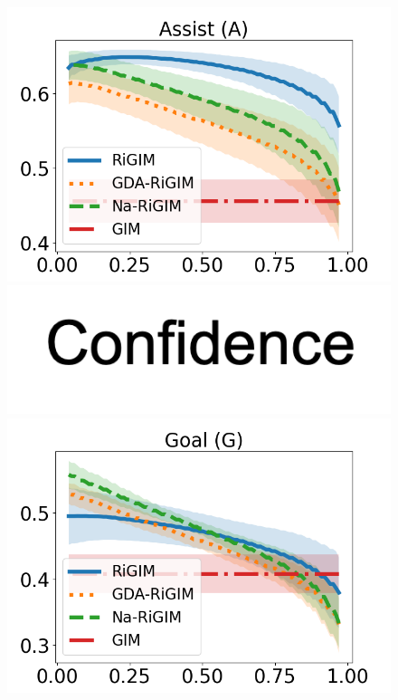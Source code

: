 \documentclass[letterpaper]{article} %
\begin{document}
\begin{figure}[htbp]
\begin{minipage}{0.01\textwidth}
    \end{minipage}
    \begin{minipage}{0.16\textwidth}
    \centering
    \includegraphics[scale=0.16]{figures/risk_curve_A_shadow.png}\par
    \vspace{-0.05in}
    \includegraphics[scale=0.12]{figures/confidence_x_label.png}
    \end{minipage}
    \begin{minipage}{0.16\textwidth}
    \centering
    \includegraphics[scale=0.16]{figures/risk_curve_G_shadow.png}\par

\end{minipage}
\end{figure}
\end{document}
